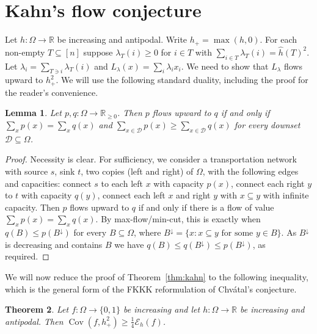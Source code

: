 \documentclass{article}
\theoremstyle{plain}
\newtheorem{theo}{Theorem}[section]
\newtheorem{lemma}[theo]{Lemma}
\theoremstyle{definition}
\newcommand{\mc}[1]{\mathcal{#1}}
\newcommand{\mb}[1]{\mathbb{#1}}
\newcommand{\sub}{\subseteq}
\newcommand{\da}{\downarrow}
\newcommand{\OO}{\Omega}
\newcommand{\on}{\operatorname}
\begin{document}
\section{Kahn's flow conjecture}\label{sec:kahn-reduction}

Let $h:\OO\to\mb R$ be increasing and antipodal. Write $h_+=\max(h,0)$.
For each non-empty $T \sub [n]$ suppose $\lambda_T(i)\ge0$ for $i\in T$ with $\sum_{i\in T}\lambda_T(i)=\widehat h(T)^2$.
Let $\lambda_i=\sum_{T\ni i}\lambda_T(i)$ and $L_\lambda(x)=\sum_i\lambda_i x_i$.
We need to show that  $L_\lambda$ flows upward to $h_+^2$.
We will use the following standard duality,
including the proof for the reader's convenience.

\begin{lemma}\label{lem:flow-cut}
Let $p,q:\OO \to \mb{R}_{\ge 0}$. Then $p$ flows upward to $q$ if and only if 
\(\sum_xp(x)=\sum_xq(x)\) and \(\sum_{x\in\mc D}p(x)\ge\sum_{x\in\mc D}q(x)\) for every downset $\mc D\sub\OO$.
\end{lemma}

\begin{proof}
Necessity is clear. For sufficiency, we consider a transportation network with source $s$, sink $t$, two copies (left and right) of $\OO$, with the following edges and capacities:
connect $s$ to each left $x$ with capacity $p(x)$, connect each right $y$ to $t$ with capacity $q(y)$, connect each left $x$ and right $y$ with $x \sub y$ with infinite capacity.
Then $p$ flows upward to $q$ if and only if there is a flow of value \(\sum_xp(x)=\sum_xq(x)\).
By max-flow/min-cut, this is exactly when \(q(B)\le p(B^\da)\) for every $B\sub\OO$, where $B^\da=\{x:x\sub y\text{ for some }y\in B\}$.
  As $B^\da$ is decreasing and contains $B$ we have \(q(B)\le q(B^\da)\le p(B^\da)\), as required.
\end{proof}

We will now reduce the proof of Theorem~\ref{thm:kahn} to the following inequality,
which is the general form of the FKKK reformulation of Chv\'atal's conjecture.

\begin{theo}\label{thm:weighted-corr-boolean}
Let $f:\OO\to\{0,1\}$ be increasing and let $h:\OO\to\mb R$ be increasing and antipodal.  Then $\on{Cov}(f,h_+^2)\ge\frac14\mc E_h(f)$.
\end{theo}
\end{document}
